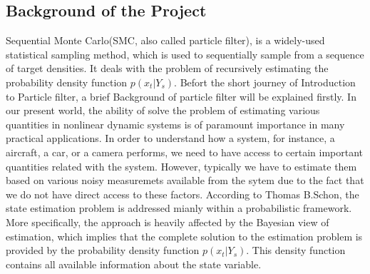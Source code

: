 \documentclass[11pt,oneside,a4paper]{article}
\begin{document}
\subsection{Background of the Project}
Sequential Monte Carlo(SMC, also called particle filter), is a widely-used statistical sampling method, which is
used to sequentially sample from a sequence of target densities. It deals with the problem of recursively estimating
the probability density function $ p(x_t|Y_s) $.
\newline Befort the short journey of Introduction to Particle filter, a brief Background of particle filter will be explained firstly. In our present world, the ability
of solve the problem of estimating various quantities in nonlinear dynamic systems is of paramount importance in many
practical applications. In order to understand how a system, for instance, a aircraft, a car, or a camera performs, we
need to have access to certain important quantities related with the system. However, typically we have to estimate them
based on various noisy measuremets available from the sytem due to the fact that we do not have direct access to these factors.
According to Thomas B.Schon, the state estimation problem is addressed mianly within a probabilistic framework. More specifically,
the approach is heavily affected by the Bayesian view of estimation, which implies that the complete solution to the
estimation problem is provided by the probability density function $ p(x_t|Y_s) $. This density function contains all available
information about the state variable.
\end{document}
